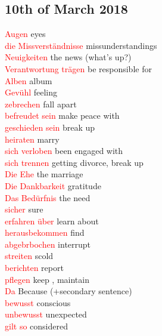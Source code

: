 \documentclass{article}
\begin{document}
\begin{multicols}{2}
	
	\section*{10th of March 2018}
	\textcolor{red}{Augen} eyes\\
	\textcolor{red}{die Missverständnisse} missunderstandings\\
	\textcolor{red}{Neuigkeiten} the news (what's up?)\\
	\textcolor{red}{Verantwortung trägen} be responsible for\\
	\textcolor{red}{Alben} album\\
	\textcolor{red}{Gevühl} feeling\\
	\textcolor{red}{zebrechen} fall apart\\
	\textcolor{red}{befreudet sein} make peace with\\
	\textcolor{red}{geschieden sein} break up\\
	\textcolor{red}{heiraten} marry\\
	\textcolor{red}{sich verloben} been engaged with\\
	\textcolor{red}{sich trennen} getting divorce, break up\\
	\textcolor{red}{Die Ehe} the marriage\\
	\textcolor{red}{Die Dankbarkeit} gratitude\\
	\textcolor{red}{Das Bedürfnis} the need\\
	\textcolor{red}{sicher} sure\\
	\textcolor{red}{erfahren über} learn about\\
	\textcolor{red}{herausbekommen} find\\
	\textcolor{red}{abgebrbochen} interrupt \\ 
	\textcolor{red}{streiten} scold \\
	\textcolor{red}{berichten} report \\
	\textcolor{red}{pflegen} keep , maintain \\
	\textcolor{red}{Da} Because (+secondary sentence)\\
	\textcolor{red}{bewusst} conscious\\
	\textcolor{red}{unbewusst} unexpected\\
	\textcolor{red}{gilt so} considered\\\\
	

\end{multicols}
\end{document}
